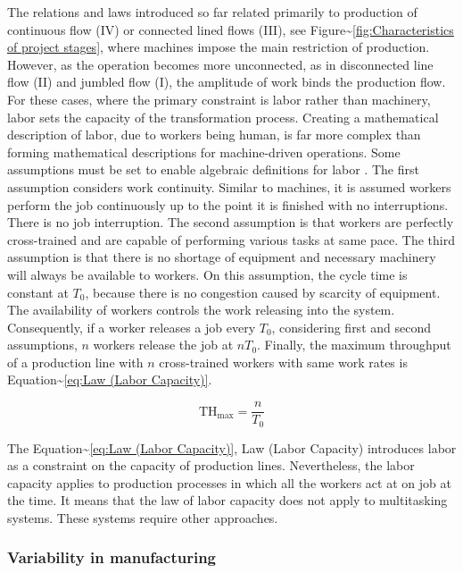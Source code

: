 \documentclass{article}
\begin{document}
The relations and laws introduced so far related primarily to production of continuous flow (IV) or connected lined flows (III), see Figure\textasciitilde{}\ref{fig:Characteristics of project stages}, where machines impose the main restriction of production.
However, as the operation becomes more unconnected, as in disconnected line flow (II) and jumbled flow (I), the amplitude of work binds the production flow.
For these cases, where the primary constraint is labor rather than machinery, labor sets the capacity of the transformation process.
Creating a mathematical description of labor, due to workers being human, is far more complex than forming mathematical descriptions for machine-driven operations.
Some assumptions must be set to enable algebraic definitions for labor \citep[pp.237-238]{Hopp2001}.
The first assumption considers work continuity.
Similar to machines, it is assumed workers perform the job continuously up to the point it is finished with no interruptions.
There is no job interruption.
The second assumption is that workers are perfectly cross-trained and are capable of performing various tasks at same pace.
The third assumption is that there is no shortage of equipment and necessary machinery will always be available to workers.
On this assumption, the cycle time is constant at \(T_0\), because there is no congestion caused by scarcity of equipment.
The availability of workers controls the work releasing into the system.
Consequently, if a worker releases a job every \(T_0\), considering first and second assumptions, \(n\) workers release the job at \(nT_0\).
Finally, the maximum throughput of a production line with \(n\) cross-trained workers with same work rates is Equation\textasciitilde{}\ref{eq:Law (Labor Capacity)}.

\begin{equation}
    \mbox{TH}_{\mbox{max}}=\frac{n}{T_0}
\label{eq:Law (Labor Capacity)}
\end{equation}

The Equation\textasciitilde{}\ref{eq:Law (Labor Capacity)}, Law (Labor Capacity) introduces labor as a constraint on the capacity of production lines.
Nevertheless, the labor capacity applies to production processes in which all the workers act at on job at the time.
It means that the law of labor capacity does not apply to multitasking systems.
These systems require other approaches.

\subsubsection{Variability in manufacturing}
\label{sec:org52b9cf0}
\end{document}
